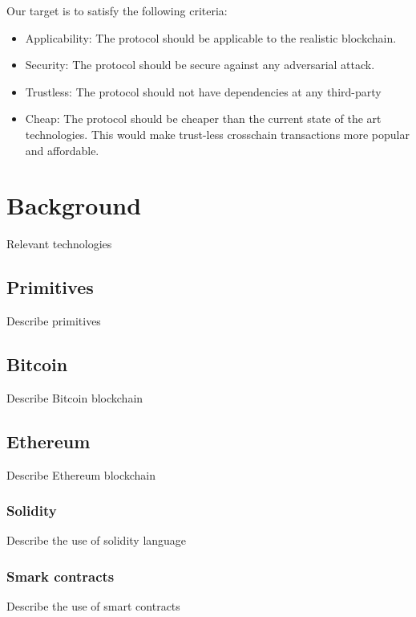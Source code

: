 \documentclass{article}
\begin{document}
  Our target is to satisfy the following criteria:
  \begin{itemize}
  \item
    Applicability: The protocol should be applicable to the realistic
    blockchain.
  \item
    Security: The protocol should be secure against any adversarial
    attack.
  \item
    Trustless: The protocol should not have dependencies at any
    third-party
  \item
    Cheap: The protocol should be cheaper than the current state of the
    art technologies. This would make trust-less crosschain transactions
    more popular and affordable.
  \end{itemize}

  \section{Background}

  Relevant technologies

  \subsection{Primitives}

  Describe primitives

  \subsection{Bitcoin}

  Describe Bitcoin blockchain

  \subsection{Ethereum}

  Describe Ethereum blockchain

  \subsubsection{Solidity}

  Describe the use of solidity language

  \subsubsection{Smark contracts}

  Describe the use of smart contracts
\end{document}

